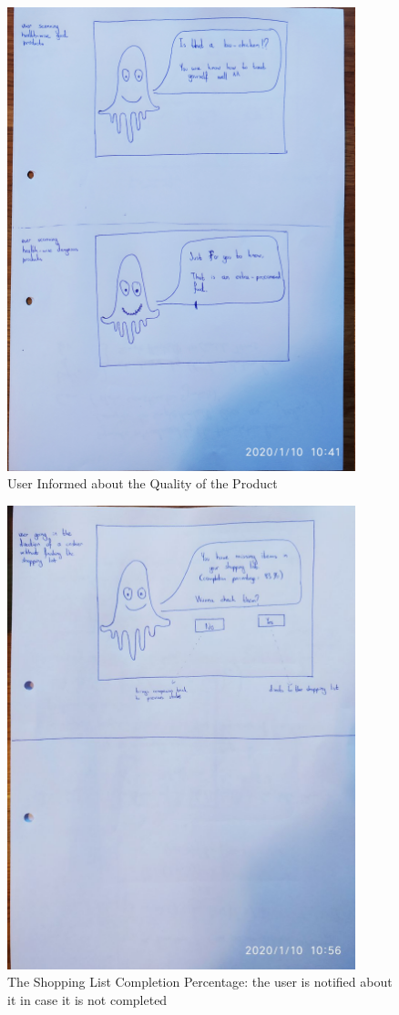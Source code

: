 \begin{figure}[H]
	\centering
	\includegraphics[trim={10em 80em 40em 0em}, clip, width=0.9\textwidth]{images/s1/p4.jpg}
	\caption{User Informed about the Quality of the Product}
	\label{s1:comment}
\end{figure}

\begin{figure}[H]
	\centering
	\includegraphics[trim={0em 70em 0em 0em}, clip, width=0.9\textwidth]{images/s1/p5.jpg}
	\caption{The Shopping List Completion Percentage: the user is notified about it in case it is not completed}
	\label{s1:percentage}
\end{figure}